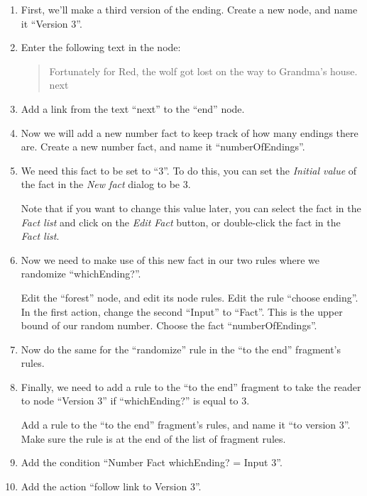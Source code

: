 \documentclass{article}
\begin{document}
\begin{enumerate}
    \item First, we'll make a third version of the ending. Create a new node, and name it ``Version 3''.
    \item Enter the following text in the node:
    
    \begin{quotation}
    \noindent Fortunately for Red, the wolf got lost on the way to Grandma's house.\\

    \noindent next
    \end{quotation}
    \item Add a link from the text ``next'' to the ``end'' node.
    \item Now we will add a new number fact to keep track of how many endings there are. Create a new number fact, and name it  ``numberOfEndings''.
    \item We need this fact to be set to ``3''. To do this, you can set the \textit{Initial value} of the fact in the \textit{New fact} dialog to be 3. 
    
Note that if you want to change this value later, you can select the fact in the \textit{Fact list} and click on the \textit{Edit Fact} button, or double-click the fact in the \textit{Fact list}.
    \item Now we need to make use of this new fact in our two rules where we randomize ``whichEnding?''.
    
Edit the ``forest'' node, and edit its node rules. Edit the rule ``choose ending''. In the first action, change the second ``Input'' to ``Fact''. This is the upper bound of our random number. Choose the fact ``numberOfEndings''.
    \item Now do the same for the ``randomize'' rule in the ``to the end'' fragment's rules.
    \item Finally, we need to add a rule to the ``to the end'' fragment to take the reader to node ``Version 3'' if ``whichEnding?'' is equal to 3.
    
Add a rule to the ``to the end'' fragment's rules, and name it ``to version 3''. Make sure the rule is at the end of the list of fragment rules.
    \item Add the condition ``Number Fact whichEnding? = Input 3''.
    \item Add the action ``follow link to Version 3''.
\end{enumerate}
\end{document}
